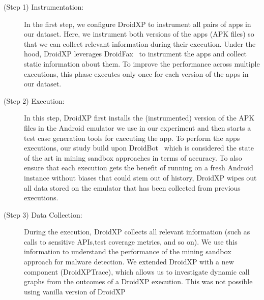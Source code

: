 \begin{description}
 \item[(Step 1) Instrumentation:] In the first step,
we configure DroidXP to instrument all pairs of apps in our dataset.
Here, we instrument both versions of the apps (APK files) so that
we can collect relevant information during their execution. Under the hood, DroidXP leverages
DroidFax~\cite{DBLP:conf/icsm/CaiR17a} to instrument the apps and collect static
information about them. To improve the performance across multiple executions,
this phase executes only once for each version of the apps in our dataset.

\item[(Step 2) Execution:] In this step, DroidXP first installs the (instrumented) version of the APK files in the
  Android emulator we use in our experiment and then starts a test case generation tools for executing the app. To perform the apps executions, our study build upon DroidBot~\cite{DBLP:conf/icse/LiYGC17} which is considered the state of the art in mining sandbox approaches in terms of accuracy. To also ensure
  that each execution gets the benefit of running on a fresh Android instance without biases that could stem out of history,
  DroidXP wipes out all data stored on the emulator that has been collected from previous executions.

\item[(Step 3) Data Collection:] During the execution, DroidXP collects all relevant information (such as calls to sensitive APIs,test coverage metrics, and so on). We use this information to understand the performance of the mining sandbox approach for malware detection. We extended DroidXP with a new component (DroidXPTrace), which allows us to investigate dynamic call graphs from the outcomes of a DroidXP execution. This was not possible using vanilla version of DroidXP %
\end{description}


